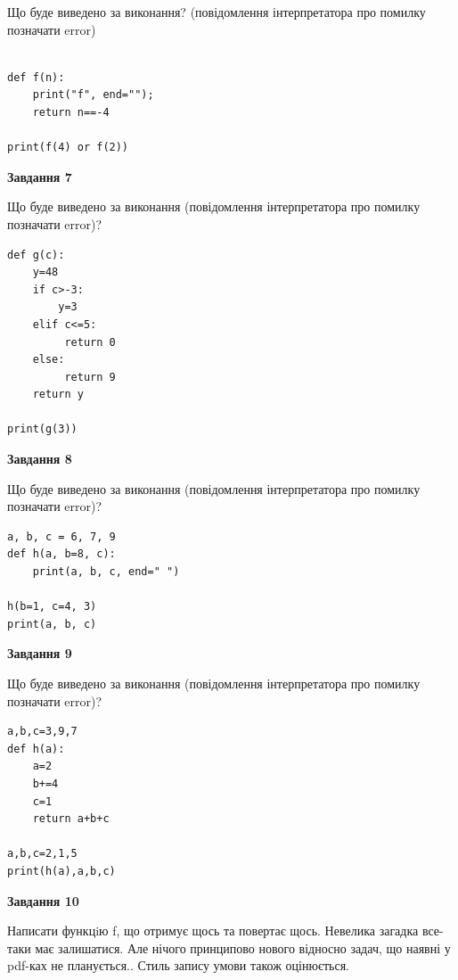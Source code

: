 \documentclass[12pt, ukrainian]{article}
\begin{document}
{\begin {large}
Що буде виведено за виконання? (повідомлення інтерпретатора про помилку позначати error)\par
\begin{verbatim}

def f(n):
    print("f", end="");
    return n==-4

print(f(4) or f(2))
\end{verbatim}

{\begin {center}\textbf{Завдання 7}\end {center}}

Що буде виведено за виконання (повідомлення інтерпретатора про помилку позначати error)?\par
\begin{verbatim}
def g(c):
    y=48
    if c>-3: 
        y=3
    elif c<=5:
         return 0
    else:
         return 9
    return y

print(g(3))
\end{verbatim}

{\begin {center}\textbf{Завдання 8}\end {center}}

Що буде виведено за виконання (повідомлення інтерпретатора про помилку позначати error)?\par
\begin{verbatim}
a, b, c = 6, 7, 9
def h(a, b=8, c):
    print(a, b, c, end=" ")

h(b=1, c=4, 3)
print(a, b, c)
\end{verbatim}

{\begin {center}\textbf{Завдання 9}\end {center}}

Що буде виведено за виконання (повідомлення інтерпретатора про помилку позначати error)?\par
\begin{verbatim}
a,b,c=3,9,7
def h(a):
    a=2
    b+=4
    c=1
    return a+b+c

a,b,c=2,1,5
print(h(a),a,b,c)
\end{verbatim}

{\begin {center}\textbf{Завдання 10}\end {center}}


Написати функцiю f, що отримує щось та повертає щось. Невелика загадка все-таки має залишатися. Але нічого принципово нового відносно задач, що наявні у pdf-ках не планується.. Стиль запису умови також оцінюється.\par
\end {large}}
\newpage
\end{document}
